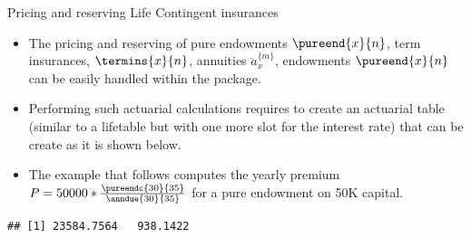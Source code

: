 \begin{frame}[fragile]{Pricing and reserving Life Contingent insurances}

\begin{itemize}[<+->]
\itemsep1pt\parskip0pt
\item
  The pricing and reserving of pure endowments \(\pureend{x}{n}\), term
  insurances, \(\termins{x}{n}\), annuities \(\ddot{a}_{x}^{\{m\}}\),
  endowments \(\pureend{x}{n}\) can be easily handled within the
  package.
\item
  Performing such actuarial calculations requires to create an actuarial
  table (similar to a lifetable but with one more slot for the interest
  rate) that can be create as it is shown below.
\end{itemize}

\begin{Shaded}
\begin{Highlighting}[]
\NormalTok{(}\NormalTok{,}
\NormalTok{,}\NormalTok{)}
\end{Highlighting}
\end{Shaded}

\end{frame}

\begin{frame}[fragile]

\begin{itemize}[<+->]
\itemsep1pt\parskip0pt
\item
  The example that follows computes the yearly premium
  \(P=50000*\frac{\pureendc{30}{35}}{\anndue{30}{35}}\) for a pure
  endowment on 50K capital.
\end{itemize}

\begin{Shaded}
\begin{Highlighting}[]
\NormalTok{*}\NormalTok{(} 
\NormalTok{,}\NormalTok{)}
\NormalTok{(}
\NormalTok{,}\NormalTok{)}
\end{Highlighting}
\end{Shaded}

\begin{verbatim}
## [1] 23584.7564   938.1422
\end{verbatim}

\end{frame}

